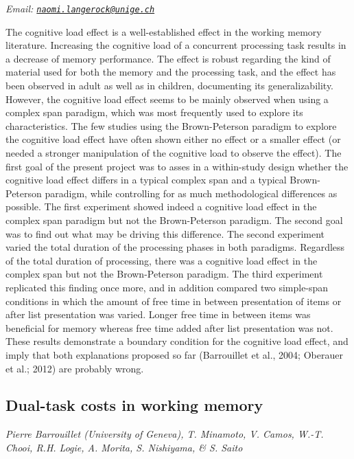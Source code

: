 \documentclass[
  12pt,
]{book}
\begin{document}
\emph{Email: \href{mailto:naomi.langerock@unige.ch}{\nolinkurl{naomi.langerock@unige.ch}}}

The cognitive load effect is a well-established effect in the working memory literature. Increasing the cognitive load of a concurrent processing task results in a decrease of memory performance. The effect is robust regarding the kind of material used for both the memory and the processing task, and the effect has been observed in adult as well as in children, documenting its generalizability. However, the cognitive load effect seems to be mainly observed when using a complex span paradigm, which was most frequently used to explore its characteristics. The few studies using the Brown-Peterson paradigm to explore the cognitive load effect have often shown either no effect or a smaller effect (or needed a stronger manipulation of the cognitive load to observe the effect). The first goal of the present project was to asses in a within-study design whether the cognitive load effect differs in a typical complex span and a typical Brown-Peterson paradigm, while controlling for as much methodological differences as possible. The first experiment showed indeed a cognitive load effect in the complex span paradigm but not the Brown-Peterson paradigm. The second goal was to find out what may be driving this difference. The second experiment varied the total duration of the processing phases in both paradigms. Regardless of the total duration of processing, there was a cognitive load effect in the complex span but not the Brown-Peterson paradigm. The third experiment replicated this finding once more, and in addition compared two simple-span conditions in which the amount of free time in between presentation of items or after list presentation was varied. Longer free time in between items was beneficial for memory whereas free time added after list presentation was not. These results demonstrate a boundary condition for the cognitive load effect, and imply that both explanations proposed so far (Barrouillet et al., 2004; Oberauer et al.; 2012) are probably wrong.

\hypertarget{dual-task-costs-in-working-memory}{%
\subsection{Dual-task costs in working memory}\label{dual-task-costs-in-working-memory}}

\emph{Pierre Barrouillet (University of Geneva), T. Minamoto, V. Camos, W.-T. Chooi, R.H. Logie, A. Morita, S. Nishiyama, \& S. Saito}
\end{document}
